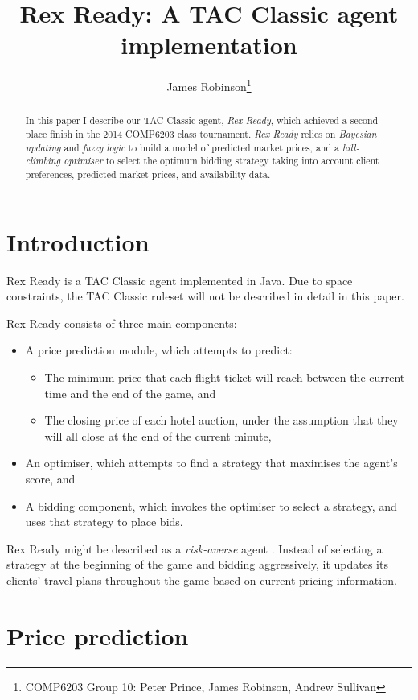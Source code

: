 \documentclass[a4paper]{proc}
\title{Rex Ready: A TAC Classic agent implementation}
\author{James Robinson\thanks{COMP6203 Group 10: Peter Prince, James Robinson, Andrew Sullivan}}
\begin{document}
\maketitle

\begin{abstract}
  In this paper I describe our TAC Classic agent, \emph{Rex Ready}, which achieved a second place finish in the 2014 COMP6203 class tournament. \emph{Rex Ready} relies on \emph{Bayesian updating} and \emph{fuzzy logic} to build a model of predicted market prices, and a \emph{hill-climbing optimiser} to select the optimum bidding strategy taking into account client preferences, predicted market prices, and availability data.
\end{abstract}

\section{Introduction}

Rex Ready is a TAC Classic agent implemented in Java. Due to space constraints, the TAC Classic ruleset will not be described in detail in this paper.

Rex Ready consists of three main components:

\begin{itemize}
  \item A price prediction module, which attempts to predict:
  \begin{itemize}
    \item The minimum price that each flight ticket will reach between the current time and the end of the game, and
    \item The closing price of each hotel auction, under the assumption that they will all close at the end of the current minute,
  \end{itemize}
  \item An optimiser, which attempts to find a strategy that maximises the agent's score, and
  \item A bidding component, which invokes the optimiser to select a strategy, and uses that strategy to place bids.
\end{itemize}

Rex Ready might be described as a \emph{risk-averse} agent \cite{SouthamptonTAC}. Instead of selecting a strategy at the beginning of the game and bidding aggressively, it updates its clients' travel plans throughout the game based on current pricing information.

\section{Price prediction}
\end{document}
